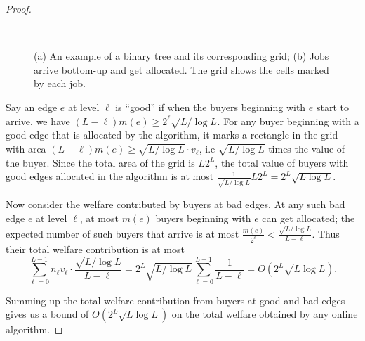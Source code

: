 \begin{proof}
    \begin{figure}[htbp]
        \centering
        \\
        \caption{\label{fig:lb-example} \small{(a) An example of a binary tree and its
              corresponding grid; (b) Jobs arrive bottom-up and get allocated. The
              grid shows the cells marked by each job.}}
    \end{figure}

    Say an edge $e$ at level $\ell$ is ``good'' if when the buyers beginning with $e$
    start to arrive, we have $(L-\ell)m(e)\geq 2^\ell\sqrt{L/\log
      L}$. For any buyer beginning with a good edge that is allocated
    by the algorithm, it marks a rectangle in the grid with area
    $(L-\ell)m(e)\geq \sqrt{L/\log L}\cdot v_\ell$, i.e
    $\sqrt{L/\log L}$ times the value of the buyer. Since the total
    area of the grid is $L2^L$, the total value of buyers with
    good edges allocated in the algorithm is at most
    $\frac{1}{\sqrt{L/\log L}}L2^L=2^L\sqrt{L\log L}$.

    Now consider the welfare contributed by buyers at bad edges. At
    any such bad edge $e$ at level $\ell$, at most $m(e)$ buyers
    beginning with $e$ can get allocated; the expected number of such
    buyers that arrive is at most
    $\frac{m(e)}{2^\ell}<\frac{\sqrt{L/\log L}}{L-\ell}$. Thus their
    total welfare contribution is at most
    \begin{equation*}
      \sum_{\ell=0}^{L-1}n_\ell v_\ell\cdot\frac{\sqrt{L/\log L}}{L-\ell}=2^L\sqrt{L/\log L}\sum_{\ell=0}^{L-1}\frac{1}{L-\ell}=O(2^L\sqrt{L\log L}).
    \end{equation*}

    Summing up the total welfare contribution from buyers at good and
    bad edges gives us a bound of $O(2^L\sqrt{L\log L})$ on the total
    welfare obtained by any online algorithm.
\end{proof}
